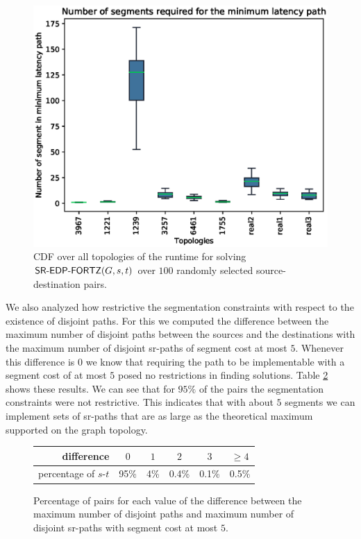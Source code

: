 \begin{figure}
\begin{center}
\includegraphics[width=.85\columnwidth]{./Network-lib/data/plot/maxEDP_boxplot.eps}
\end{center}
\caption{CDF over all topologies of the runtime for solving $\textsf{SR-EDP-FORTZ}(G, s, t)$ over $100$ randomly selected source-destination pairs.}
\label{fig:maxEDP_boxplot}
\end{figure}

We also analyzed how restrictive the segmentation constraints with respect to the existence of disjoint paths.
For this we computed the difference between the maximum number of disjoint paths between the sources and the destinations
with the maximum number of disjoint sr-paths of segment cost at most $5$. Whenever this difference is $0$ we know that
requiring the path to be implementable with a segment cost of at most $5$ posed no restrictions in finding solutions.
Table \ref{tab:nbp_vs_seg} shows these results. We can see that for $95\%$ of the pairs the segmentation constraints were
not restrictive. This indicates that with about $5$ segments we can implement sets of sr-paths that are as large as the
theoretical maximum supported on the graph topology.

\begin{figure}
\begin{center}
\begin{tabular}{rccccc}
\toprule
difference & $0$ & $1$ & $2$ & $3$ & $\geq 4$ \\
\midrule
percentage of $s$-$t$           & 95\% & 4\% & 0.4\% & 0.1\% & 0.5\%
\end{tabular}
\end{center}
\caption{Percentage of pairs for each value of the difference between the maximum number of disjoint paths and maximum number of disjoint sr-paths with segment
cost at most $5$.}
\label{tab:nbp_vs_seg}
\end{figure}

